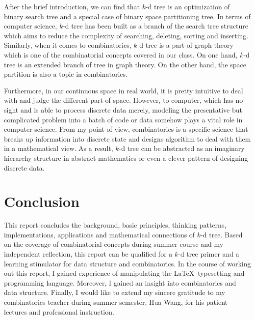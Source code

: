 \documentclass[12pt, a4paper]{article}
\begin{document}
        After the brief introduction, we can find that $k$-d tree is an optimization of binary search tree and a special case of binary space partitioning tree. In terms of computer science, $k$-d tree has been built as a branch of the search tree structure which aims to reduce the complexity of searching, deleting, sorting and inserting. Similarly, when it comes to combinatorics, $k$-d tree is a part of graph theory which is one of the combinatorial concepts covered in our class. On one hand, $k$-d tree is an extended branch of tree in graph theory. On the other hand, the space partition is also a topic in combinatorics.

        Furthermore, in our continuous space in real world, it is pretty intuitive to deal with and judge the different part of space. However, to computer, which has no sight and is able to process discrete data merely, modeling the presentative but complicated problem into a batch of code or data somehow plays a vital role in computer science. From my point of view, combinatorics is a specific science that breaks up information into discrete state and designs algorithm to deal with them in a mathematical view. As a result, $k$-d tree can be abstracted as an imaginary hierarchy structure in abstract mathematics or even a clever pattern of designing discrete data.

    \section{Conclusion}

        This report concludes the background, basic principles, thinking patterns, implementations, applications and mathematical connections of $k$-d tree. Based on the coverage of combinatorial concepts during summer course and my independent reflection, this report can be qualified for a $k$-d tree primer and a learning stimulator for data structure and combinatorics. In the course of working out this report, I gained experience of manipulating the \LaTeX \ typesetting and programming language. Moreover, I gained an insight into combinatorics and data structure. Finally, I would like to extend my sincere gratitude to my combinatorics teacher during summer semester, Hua Wang, for his patient lectures and professional instruction.

    
    
\end{document}
